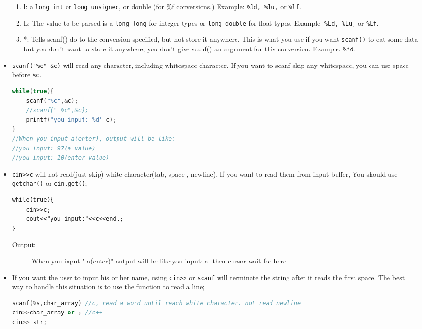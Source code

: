 \documentclass[a4paper,11pt,twoside]{book}
\begin{document}
\begin{itemize}
\begin{enumerate}
		\item l:  a \texttt{long int} or \texttt{long unsigned}, or double (for \%f conversions.) Example: \texttt{\%ld, \%lu,} or \texttt{\%lf}.
		
		\item L: The value to be parsed is a \texttt{long long} for integer types or \texttt{long double} for float types. Example: \texttt{\%Ld, \%Lu,} or \texttt{\%Lf}.
		
		\item *: Tells scanf() do to the conversion specified, but not store it anywhere. This is what you use if you want \texttt{scanf()} to eat some data but you don't want to store it anywhere; you don't give scanf() an argument for this conversion. Example: \texttt{\%*d}.
	\end{enumerate}
	
	
	\item \texttt{scanf("\%c" \&c)} will read any character, including whitespace character. If you want to scanf skip any whitespace, you can use space before \texttt{\%c}.
	
\begin{lstlisting}[frame=single, language=c++, mathescape=true]
while(true){
	scanf("%c",&c);
	//scanf(" %c",&c);
	printf("you input: %d" c);
}
//When you input a(enter), output will be like:
//you input: 97(a value)
//you input: 10(enter value)
\end{lstlisting}

	\item \verb=cin>>c= will not read(just skip) white character(tab, space , newline), If you want to read them from input buffer, You should use \texttt{getchar()} or \texttt{cin.get()}; 
\begin{lstlisting}
while(true){
	cin>>c;
	cout<<"you input:"<<c<<endl;
}
	\end{lstlisting}
	\begin{description}
		\item[Output:] When you input  "    a(enter)"
		output will be like:you input:  a. then cursor wait for here.
	\end{description}
	
	\item If you want the user to input his or her name, using \verb=cin>>= or \texttt{scanf} will terminate the string after it reads the first space. The best way to handle this situation is to use the function to read a line;

\begin{lstlisting}[frame=single, language=c++]
scanf(%s,char_array) //c, read a word until reach white character. not read newline
cin>>char_array or ; //c++
cin>> str;
	

\end{lstlisting}
\end{itemize}
\end{document}

